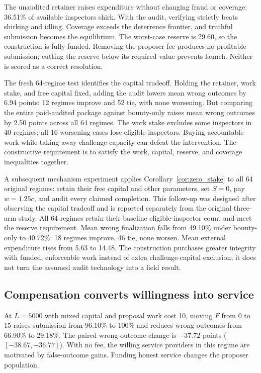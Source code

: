 \documentclass[10pt]{article}
\begin{document}
The unaudited retainer raises expenditure without changing fraud or coverage: 36.51\% of available inspectors shirk. With the audit, verifying strictly beats shirking and idling. Coverage exceeds the deterrence frontier, and truthful submission becomes the equilibrium. The worst-case reserve is 29.60, so the construction is fully funded. Removing the proposer fee produces no profitable submission; cutting the reserve below its required value prevents launch. Neither is scored as a correct resolution.

The fresh 64-regime test identifies the capital tradeoff. Holding the retainer, work stake, and free capital fixed, adding the audit lowers mean wrong outcomes by 6.94 points: 12 regimes improve and 52 tie, with none worsening. But comparing the entire paid-audited package against bounty-only raises mean wrong outcomes by 2.50 points across all 64 regimes. The work stake excludes some inspectors in 40 regimes; all 16 worsening cases lose eligible inspectors. Buying accountable work while taking away challenge capacity can defeat the intervention. The constructive requirement is to satisfy the work, capital, reserve, and coverage inequalities together.

A subsequent mechanism experiment applies Corollary~\ref{cor:zero_stake} to all 64 original regimes: retain their free capital and other parameters, set $S=0$, pay $w=1.25c$, and audit every claimed completion. This follow-up was designed after observing the capital tradeoff and is reported separately from the original three-arm study. All 64 regimes retain their baseline eligible-inspector count and meet the reserve requirement. Mean wrong finalization falls from 49.10\% under bounty-only to 40.72\%: 18 regimes improve, 46 tie, none worsen. Mean external expenditure rises from 5.63 to 14.48. The construction purchases greater integrity with funded, enforceable work instead of extra challenge-capital exclusion; it does not turn the assumed audit technology into a field result.

\subsection{Compensation converts willingness into service}

At $L=5000$ with mixed capital and proposal work cost 10, moving $F$ from 0 to 15 raises submission from 96.10\% to 100\% and reduces wrong outcomes from 66.90\% to 29.18\%. The paired wrong-outcome change is $-37.72$ points ($[-38.67,-36.77]$). With no fee, the willing service providers in this regime are motivated by false-outcome gains. Funding honest service changes the proposer population.
\end{document}
